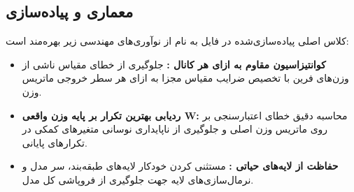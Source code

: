 \subsection{معماری و پیاده‌سازی}
کلاس اصلی پیاده‌سازی‌شده در فایل  به نام  از نوآوری‌های مهندسی زیر بهره‌مند است:
\begin{itemize}
\item \textbf{کوانتیزاسیون مقاوم به ازای هر کانال :} جلوگیری از خطای مقیاس ناشی از وزن‌های فرین  با تخصیص ضرایب مقیاس مجزا به ازای هر سطر خروجی ماتریس وزن.
\item \textbf{ردیابی بهترین تکرار بر پایه وزن واقعی W:} محاسبه دقیق خطای اعتبارسنجی بر روی ماتریس وزن اصلی و جلوگیری از ناپایداری نوسانی متغیرهای کمکی در تکرارهای پایانی.
\item \textbf{حفاظت از لایه‌های حیاتی :} مستثنی کردن خودکار لایه‌های طبقه‌بند، سر مدل  و نرمال‌سازی‌های لایه جهت جلوگیری از فروپاشی کل مدل.
\end{itemize}
